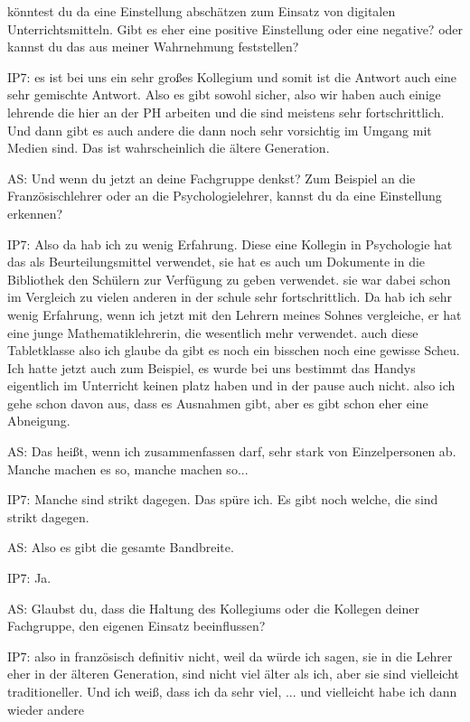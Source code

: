 \documentclass[fontsize=11pt,paper=a4]{scrbook}
\begin{document}
{\begin{itemize*}
könntest du da eine Einstellung abschätzen
zum Einsatz von digitalen Unterrichtsmitteln. Gibt es eher eine positive
Einstellung oder eine negative? oder
kannst du das aus meiner Wahrnehmung feststellen?
\item[IP7:]
es ist bei uns ein sehr großes Kollegium und
somit ist die Antwort auch eine sehr
gemischte Antwort. Also es gibt sowohl sicher, also
wir haben auch einige lehrende die hier an der PH arbeiten und die sind meistens
sehr fortschrittlich. Und dann gibt es auch
andere die dann noch sehr vorsichtig im Umgang mit Medien sind. Das ist wahrscheinlich  die ältere Generation.
\item[AS:] Und wenn du jetzt an deine Fachgruppe denkst? Zum Beispiel an die Französischlehrer oder an die Psychologielehrer, kannst du da eine Einstellung erkennen?
\item[IP7:] Also da  hab ich  zu wenig
Erfahrung. Diese eine Kollegin in
Psychologie hat das als Beurteilungsmittel verwendet, sie hat es auch um
Dokumente in die Bibliothek den Schülern zur Verfügung zu
geben verwendet. sie war dabei schon im Vergleich zu vielen anderen in
der schule sehr fortschrittlich. Da hab ich sehr wenig Erfahrung, wenn ich jetzt mit den Lehrern meines Sohnes vergleiche,
er hat eine junge Mathematiklehrerin, die wesentlich mehr verwendet. 
auch diese Tabletklasse also ich
glaube da gibt es noch ein bisschen
noch eine gewisse Scheu. Ich hatte jetzt auch zum Beispiel, es wurde bei uns bestimmt das Handys eigentlich im Unterricht keinen platz
haben und in der pause auch nicht. also
ich gehe schon davon aus, dass es Ausnahmen gibt, aber es gibt schon eher eine Abneigung.
\item[AS:] Das heißt,
wenn ich zusammenfassen darf, sehr
stark von Einzelpersonen ab. Manche
machen es so,  manche machen so...
\item[IP7:] Manche sind strikt dagegen. Das spüre ich. Es gibt noch welche, die sind strikt dagegen.
\item[AS:] Also es gibt die gesamte Bandbreite.
\item[IP7:] Ja.
\item[AS:] Glaubst du, dass die Haltung des
Kollegiums oder die Kollegen deiner
Fachgruppe, den eigenen Einsatz
beeinflussen?
\item[IP7:] also in französisch
definitiv nicht, weil da würde ich sagen,
sie in die Lehrer eher in der älteren Generation, sind nicht viel älter als ich, aber sie sind vielleicht traditioneller. Und ich weiß, dass ich da sehr viel, ... und vielleicht habe ich dann wieder andere

\end{itemize*}}
\end{document}
